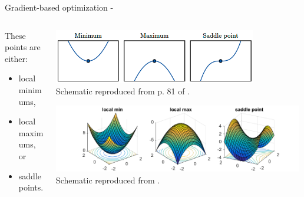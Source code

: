 \begin{frame}[t,allowframebreaks]{Gradient-based optimization -}
    \vspace{0.2cm}

    \begin{columns}
        \begin{column}{0.32\textwidth}
            These points are either: 
            \begin{itemize}
              \item {}\glspl{local minimum}, 
              \item {}\glspl{local maximum}, or
              \item {}\glspl{saddle point}.\\        
            \end{itemize}
            \end{column}
        \begin{column}{0.68\textwidth}

            \begin{center}
                \includegraphics[width=0.80\textwidth]
                    {./images/grad_descent/goodfellow17_min_max_saddle_1d.png}\\
                {\tiny 
                    \color{col:attribution} 
                    Schematic reproduced from p. 81 of \cite{Goodfellow:2017MITDL}.\\
                }

                \vspace{0.6cm}

                \includegraphics[width=0.99\textwidth]
                    {./images/grad_descent/ge16_min_max_saddle_2d.png}\\
                {\tiny 
                    \color{col:attribution} 
                    Schematic reproduced from \cite{OffConvex:EscapingSaddlePoints}.\\
                }
            \end{center}        
        
        \end{column}
    \end{columns}

\end{frame}


